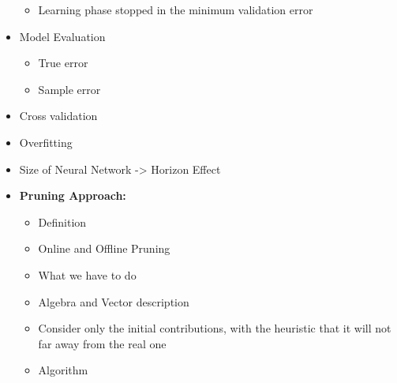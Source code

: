 \begin{itemize}
\begin{itemize}
        \item Learning phase stopped in the minimum validation error
    \end{itemize}
    \item Model Evaluation
    \begin{itemize}
        \item True error
        \item Sample error
    \end{itemize}
    \item Cross validation
    \item Overfitting
    \item Size of Neural Network -> Horizon Effect
    \item \textbf{Pruning Approach:}
    \begin{itemize}
        \item Definition
        \item Online and Offline Pruning
        \item What we have to do
        \item Algebra and Vector description
        \item Consider only the initial contributions, with the heuristic that it will not far away from the real one
        \item Algorithm
    \end{itemize}
\end{itemize}

